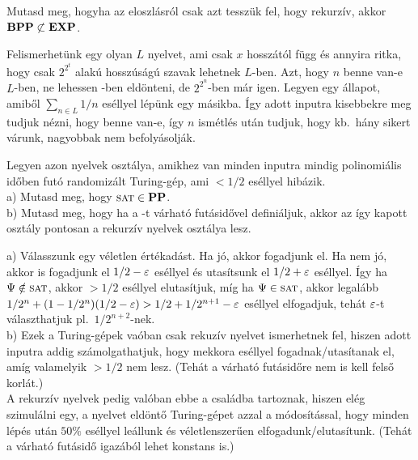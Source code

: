 \begin{Exercise}[counter={sorszam}, difficulty=1]
	Mutasd meg, hogyha az eloszl\'asr\'ol csak azt tessz\"uk fel, hogy rekurz\'iv,
	akkor $\mbox{\ensuremath{\mathbf{BPP}}}\not\subset \mbox{\ensuremath{\mathbf{EXP}}}$.
\end{Exercise}	
\begin{Answer}
	Felismerhet\"unk egy olyan $L$ nyelvet, ami csak $x$ hossz\'at\'ol f\"ugg \'es annyira ritka, hogy csak $2^{2^t}$ alak\'u hossz\'us\'ag\'u szavak lehetnek $L$-ben.
	Azt, hogy $n$ benne van-e $L$-ben, ne lehessen \EXP-ben eld\"onteni, de $2^{2^n}$-ben m\'ar igen.
	Legyen egy \'allapot, amib\H ol $\sum_{n\in L} 1/n$ es\'ellyel l\'ep\"unk egy m\'asikba.
	\'Igy adott inputra kisebbekre meg tudjuk n\'ezni, hogy benne van-e, \'igy $n$ ism\'etl\'es ut\'an tudjuk, hogy kb.\ h\'any sikert v\'arunk, nagyobbak nem befoly\'asolj\'ak.
\end{Answer}


\begin{Exercise}[counter={sorszam}, difficulty=0]
	Legyen \PP azon nyelvek oszt\'alya, amikhez van minden inputra mindig polinomi\'alis id\H oben fut\'o randomiz\'alt Turing-g\'ep, ami $<1/2$ es\'ellyel hib\'azik.\\
	a) Mutasd meg, hogy $\mbox{\sc{sat}}\in\mbox{\ensuremath{\mathbf{PP}}}$.\\
	b) Mutasd meg, hogy ha a \PP -t v\'arhat\'o fut\'asid\H ovel defini\'aljuk, akkor
	az \'igy kapott oszt\'aly pontosan a rekurz\'iv nyelvek oszt\'alya lesz.
\end{Exercise}	
\begin{Answer}
	a) V\'alasszunk egy v\'eletlen \'ert\'ekad\'ast.
	Ha j\'o, akkor fogadjunk el.
	Ha nem j\'o, akkor is fogadjunk el $1/2-\varepsilon$ es\'ellyel \'es utas\'itsunk el $1/2+\varepsilon$ es\'ellyel.
	\'Igy ha $\Psi\notin \mbox{\sc{sat}}$, akkor $>1/2$ es\'ellyel elutas\'itjuk, m\'ig ha $\Psi\in\mbox{\sc{sat}}$, akkor legal\'abb $1/2^n+(1-1/2^n)(1/2-\varepsilon)>1/2+1/2^{n+1}-\varepsilon$ es\'ellyel elfogadjuk, teh\'at $\varepsilon$-t v\'alaszthatjuk pl.\ $1/2^{n+2}$-nek.\\
	b) Ezek a Turing-g\'epek va\'oban csak rekuz\'iv nyelvet ismerhetnek fel, hiszen adott inputra addig sz\'amol\-gat\-hat\-juk, hogy mekkora es\'ellyel fogadnak/utas\'itanak el, am\'ig valamelyik $>1/2$ nem lesz.
	(Teh\'at a v\'arhat\'o fut\'asid\H ore nem is kell fels\H o korl\'at.)\\
	A rekurz\'iv nyelvek pedig val\'oban ebbe a csal\'adba tartoznak, hiszen el\'eg szimul\'alni egy, a nyelvet eld\"ont\H o Turing-g\'epet azzal a m\'odos\'it\'assal, hogy minden l\'ep\'es ut\'an $50\%$ es\'ellyel le\'allunk \'es v\'eletlenszer\H uen elfogadunk/elutas\'itunk.
	(Teh\'at a v\'arhat\'o fut\'asid\H o igaz\'ab\'ol lehet konstans is.)
\end{Answer}


